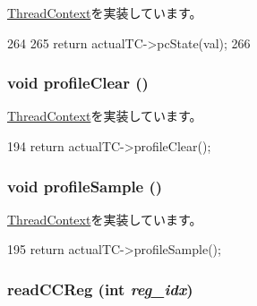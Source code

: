 \hyperlink{classThreadContext_aaeee41ee07ac94c41a94512f28a431fa}{ThreadContext}を実装しています。


\begin{DoxyCode}
264     {
265         return actualTC->pcState(val);
266     }
\end{DoxyCode}
\hypertarget{classCheckerThreadContext_acf9c88860776d7bd752317e8b550a5d5}{
\subsubsection[{profileClear}]{\setlength{\rightskip}{0pt plus 5cm}void profileClear ()}}
\label{classCheckerThreadContext_acf9c88860776d7bd752317e8b550a5d5}


\hyperlink{classThreadContext_ac9ebb698bd789f38c55af10256aab7e8}{ThreadContext}を実装しています。


\begin{DoxyCode}
194 { return actualTC->profileClear(); }
\end{DoxyCode}
\hypertarget{classCheckerThreadContext_aba547b904bdcf83196f983f79d285caf}{
\subsubsection[{profileSample}]{\setlength{\rightskip}{0pt plus 5cm}void profileSample ()}}
\label{classCheckerThreadContext_aba547b904bdcf83196f983f79d285caf}


\hyperlink{classThreadContext_a46e9ef08695527c8b4bd0e668bced5a8}{ThreadContext}を実装しています。


\begin{DoxyCode}
195 { return actualTC->profileSample(); }
\end{DoxyCode}
\hypertarget{classCheckerThreadContext_ac3d147c535052bfb1f8e8fe0697168d7}{
\subsubsection[{readCCReg}]{ readCCReg (int {\em reg\_\-idx})}}
\label{classCheckerThreadContext_ac3d147c535052bfb1f8e8fe0697168d7}


